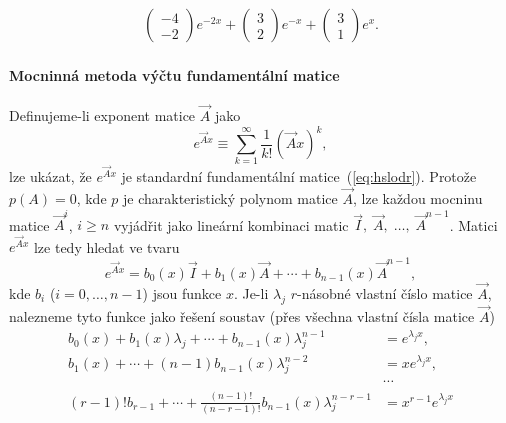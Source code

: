 \begin{sol}
\[\begin{split}
                        \begin{pmatrix}
                        -4 \\ -2
                        \end{pmatrix}
                        e^{-2x}
                        +
                        \begin{pmatrix}
                        3 \\ 2
                        \end{pmatrix}
                        e^{-x}
                        +
                        \begin{pmatrix}
                        3 \\ 1
                        \end{pmatrix}
                        e^{x}.
     \end{split}
   \]
\end{sol}
      
      


\paragraph{Mocninná metoda výčtu fundamentální matice}
Definujeme-li exponent matice $\vec{A}$ jako
\[
   e^{\vec{A}x} \equiv \sum\limits_{k=1}^{\infty}\frac{1}{k!}(\vec{A}x)^k,
\]
lze ukázat, že $e^{\vec{A}x}$ je standardní fundamentální matice~(\ref{eq:hslodr}).
Protože $p({A})=0$, kde $p$ je charakteristický polynom matice $\vec{A}$,
lze každou mocninu matice $\vec{A}^i$, $i\geq n$ vyjádřit jako lineární kombinaci
matic $\vec{I}, \; \vec{A},\;\ldots,\;\vec{A}^{n-1}$.
Matici $e^{\vec{A}x}$ lze tedy hledat ve tvaru
\[
   e^{\vec{A}x} = b_0(x)\vec{I}+b_1(x)\vec{A}+\cdots+b_{n-1}(x)\vec{A}^{n-1},
\]
kde $b_i$ ($i=0,\ldots,n-1$) jsou funkce $x$.
Je-li $\lambda_j$ $r$-násobné vlastní číslo matice $\vec{A}$,
nalezneme tyto funkce jako řešení soustav (přes všechna vlastní čísla matice $\vec{A}$)
\[
   \begin{split}
   b_0(x)+b_1(x)\lambda_j+\cdots+b_{n-1}(x)\lambda_j^{n-1}&=e^{\lambda_j x},\\
   b_1(x)+\cdots+(n-1)b_{n-1}(x)\lambda_j^{n-2}&=xe^{\lambda_j x},\\
     &\cdots\\   
   (r-1)!b_{r-1}+\cdots+\frac{(n-1)!}{(n-r-1)!}b_{n-1}(x)\lambda_j^{n-r-1}&=x^{r-1}e^{\lambda_jx}
   \end{split}
\]

